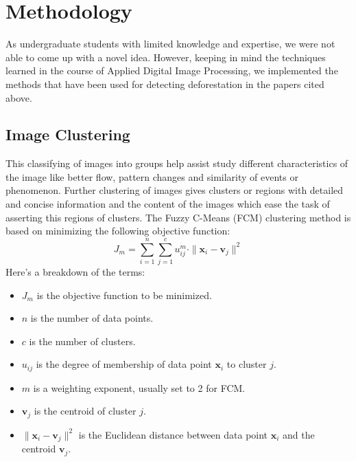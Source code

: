 \documentclass[12pt,a4paper,IEEEtran]{article}
\begin{document}

\section{Methodology}
As undergraduate students with limited knowledge and expertise, we were not able to come up with a novel idea. However, keeping in mind the techniques learned in the course of Applied Digital Image Processing, we implemented the methods that have been used for detecting deforestation in the papers cited above.

\subsection[4.1]{Image Clustering}
This classifying of images into groups help assist study different characteristics of the image like better flow, pattern changes and similarity of events or phenomenon. Further clustering of images gives clusters or regions with detailed and concise information and the content of the images which ease the task of asserting this regions of clusters. 
\newpage The Fuzzy C-Means (FCM) clustering method \cite{BEZDEK1984191} is based on minimizing the following objective function:
\begin{equation}
J_m = \sum_{i=1}^{n} \sum_{j=1}^{c} u_{ij}^m \cdot \|\mathbf{x}_i - \mathbf{v}_j\|^2
\end{equation}
\newline Here's a breakdown of the terms:
\begin{itemize}
    \item $J_m$ is the objective function to be minimized.
    \item $n$ is the number of data points.
    \item $c$ is the number of clusters.
    \item $u_{ij}$ is the degree of membership of data point $\mathbf{x}_i$ to cluster $j$.
    \item $m$ is a weighting exponent, usually set to 2 for FCM.
    \item $\mathbf{v}_j$ is the centroid of cluster $j$.
    \item $\|\mathbf{x}_i - \mathbf{v}_j\|^2$ is the Euclidean distance between data point $\mathbf{x}_i$ and the centroid $\mathbf{v}_j$.
\end{itemize}
\end{document}
